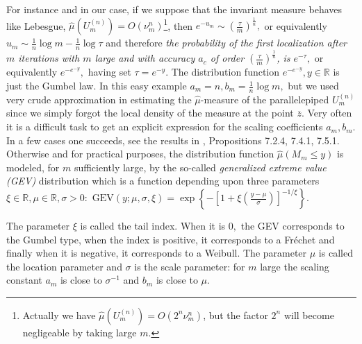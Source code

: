\documentclass[12pt,reqno,a4paper]{amsart}
\begin{document}
 For instance and in our case, if we suppose that the invariant measure behaves like Lebesgue,  $\hat{\mu}(U^{(n)}_m)=O(\nu_m^{n})$\footnote{ Actually we have $\hat{\mu}(U^{(n)}_m)=O(2^n\nu_m^{n})$, but the factor $2^n$ will become negligeable by taking large $m.$}, then $e^{-u_m}\sim \left(\frac{\tau}{m}\right)^{\frac{1}{n}},$ or equivalently $u_m\sim \frac1n\log m-\frac1n \log \tau$ and therefore {\em the probability of the first localization after $m$ iterations with $m$ large and with accuracy $a_c$  of order $\left(\frac{\tau}{m}\right)^{\frac{1}{n}}$, is $e^{-\tau},$} or equivalently $e^{-e^{-y}},$ having set $\tau=e^{-y}.$ The distribution function $e^{-e^{-y}}, y\in \mathbb{R}$ is just the Gumbel law. In this easy example $a_m=n, b_m=\frac1n \log m,$ but we used very crude approximation in estimating the $\hat{\mu}$-measure of the parallelepiped $U^{(n)}_m$ since we simply forgot the local density of the measure at the point $\overline{z}.$ Very often it is a difficult task to get an explicit expression for the scaling coefficients $a_m, b_m$. In a few cases one succeeds, see the results in \cite{ERDS}, Propositions 7.2.4, 7.4.1, 7.5.1.  Otherwise and for practical purposes,  the distribution function $\hat{\mu}(M_m\le y)$ is modeled, for $m$ sufficiently large, by the so-called {\em generalized extreme value (GEV)} distribution which is a  function depending upon three parameters $\xi\in \mathbb{R}, \mu\in \mathbb{R}, \sigma>0:$
$
\text{GEV}(y;\mu,\sigma, \xi)=\exp\left\{-\left[1+\xi\left(\frac{y-\mu}{\sigma}\right)\right]^{-1/\xi}\right\}.$

The parameter $\xi$ is called the tail index. When it is $0,$ the GEV corresponds to the Gumbel type, when the index is positive, it corresponds to a Fr\'echet and finally when it is negative, it corresponds to a Weibull. The parameter $\mu$ is called the location parameter and $\sigma$ is the scale parameter: for $m$ large the scaling constant $a_m$ is close to $\sigma^{-1}$ and $b_m$ is close to $\mu.$ \\
\end{document}
